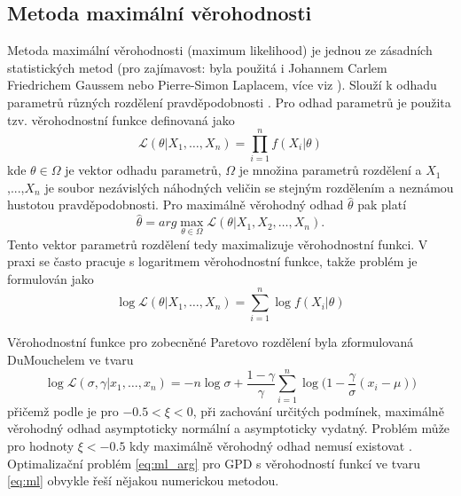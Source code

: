 \subsection{Metoda maximální věrohodnosti}
Metoda maximální věrohodnosti (maximum likelihood) je jednou ze zásadních statistických metod (pro zajímavost: byla použitá i Johannem Carlem Friedrichem Gaussem nebo Pierre-Simon Laplacem, více viz \cite{history}). Slouží k odhadu parametrů různých rozdělení pravděpodobnosti \cite{stat_bible}. Pro odhad parametrů je použita tzv. věrohodnostní funkce definovaná jako
\begin{equation}\label{eq:ml_arg}
\mathcal{L}(\theta|X_1,\dots,X_n)=\prod_{i=1}^n f(X_i|\theta)
\end{equation}
kde $\theta\in \Omega$ je vektor odhadu parametrů, $\Omega$ je množina parametrů rozdělení a $X_1$,...,$X_n$ je soubor nezávislých náhodných veličin se stejným rozdělením a neznámou hustotou pravděpodobnosti. Pro maximálně věrohodný odhad $\hat{\theta}$ pak platí
\begin{equation}
\hat{\theta}=arg \max_{\theta \in \Omega} \mathcal{L}(\theta|X_1,X_2,\dots,X_n).
\end{equation}
Tento vektor parametrů rozdělení tedy maximalizuje věrohodnostní funkci. V praxi se často pracuje s logaritmem věrohodnostní funkce, takže problém je formulován jako
\begin{equation}
\log \mathcal{L}(\theta|X_1,\dots,X_n)=\sum_{i=1}^n \log f(X_i|\theta)
\end{equation}

\par Věrohodnostní funkce pro zobecněné Paretovo rozdělení byla  zformulovaná DuMouchelem \cite{DuMouchel} ve tvaru
\begin{equation}\label{eq:ml}
\log\mathcal{L}(\sigma, \gamma|x_{1},\dots,x_{n})= -n \log \sigma +  \frac{1-\gamma}{\gamma}\sum_{i=1}^n\log\Big(1 - \frac{\gamma}{\sigma}(x_{i}-\mu)\Big)
\end{equation}
přičemž podle \cite{SmithML} je pro $-0.5 < \xi < 0$, při zachování určitých podmínek, maximálně věrohodný odhad asymptoticky normální a asymptoticky vydatný. Problém může pro hodnoty $\xi < -0.5$ kdy maximálně věrohodný odhad nemusí existovat \cite{grim}. Optimalizační problém \ref{eq:ml_arg}  pro GPD s věrohodností funkcí ve tvaru \ref{eq:ml} obvykle řeší nějakou numerickou metodou.
